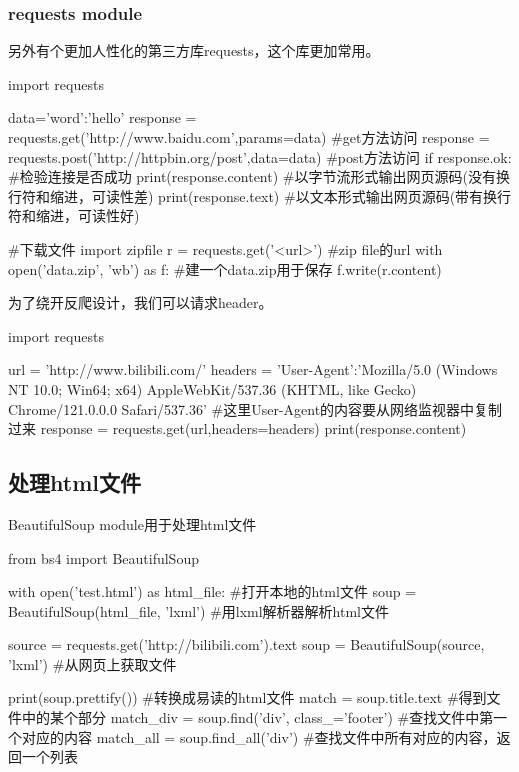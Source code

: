     \subsubsection{requests module}
      另外有个更加人性化的第三方库requests，这个库更加常用。
      \begin{codeblock}[language=python, caption={requests module}]
        import requests

        data={'word':'hello'}
        response = requests.get('http://www.baidu.com',params=data) #get方法访问
        response = requests.post('http://httpbin.org/post',data=data) #post方法访问
        if response.ok: #检验连接是否成功
            print(response.content) #以字节流形式输出网页源码(没有换行符和缩进，可读性差)
            print(response.text) #以文本形式输出网页源码(带有换行符和缩进，可读性好)

        #下载文件
        import zipfile
        r = requests.get('<url>') #zip file的url
        with open('data.zip', 'wb') as f: #建一个data.zip用于保存
            f.write(r.content)
      \end{codeblock}

      为了绕开反爬设计，我们可以请求header。
      \begin{codeblock}[language=python, caption={Handling request headers}]
        import requests

        url = 'http://www.bilibili.com/'
        headers = {'User-Agent':'Mozilla/5.0 (Windows NT 10.0; Win64; x64) 
            AppleWebKit/537.36 (KHTML, like Gecko) Chrome/121.0.0.0 Safari/537.36'}
        #这里User-Agent的内容要从网络监视器中复制过来
        response = requests.get(url,headers=headers)
        print(response.content)
      \end{codeblock}

  \subsection{处理html文件}
    BeautifulSoup module用于处理html文件
    \begin{codeblock}[language=python, caption={Handling HTML}]
      from bs4 import BeautifulSoup

      with open('test.html') as html_file: #打开本地的html文件
          soup = BeautifulSoup(html_file, 'lxml') #用lxml解析器解析html文件

      source = requests.get('http://bilibili.com').text
      soup = BeautifulSoup(source, 'lxml') #从网页上获取文件

      print(soup.prettify()) #转换成易读的html文件
      match = soup.title.text #得到文件中的某个部分
      match_div = soup.find('div', class_='footer') #查找文件中第一个对应的内容
      match_all = soup.find_all('div') #查找文件中所有对应的内容，返回一个列表
    \end{codeblock}

